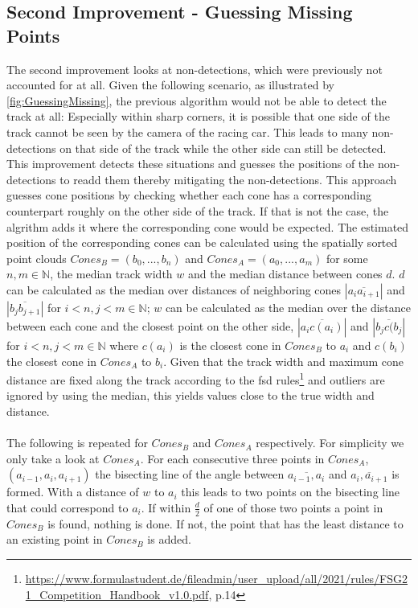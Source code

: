\subsection{Second Improvement - Guessing Missing Points}
The second improvement looks at non-detections, which were previously not accounted for at all. Given the following scenario, as illustrated by \ref{fig:GuessingMissing}, the previous algorithm would not be able to detect the track at all: Especially within sharp corners, it is possible that one side of the track cannot be seen by the camera of the racing car. This leads to many non-detections on that side of the track while the other side can still be detected. This improvement detects these situations and guesses the positions of the non-detections to readd them thereby mitigating the non-detections. This approach guesses cone positions by checking whether each cone has a corresponding counterpart roughly on the other side of the track. If that is not the case, the algrithm adds it where the corresponding cone would be expected. The estimated position of the corresponding cones can be calculated using the spatially sorted point clouds $Cones_B = (b_0,...,b_n)$ and $Cones_A = (a_0,...,a_m)$ for some $n,m \in \mathbb{N}$, the median track width $w$ and the median distance between cones $d$. $d$ can be calculated as the median over distances of neighboring cones $|\overline{a_i a_{i+1}}|$ and $|\overline{b_j b_{j+1}}|$ for $i<n,j<m \in \mathbb{N}$; $w$ can be calculated as the median over the distance between each cone and the closest point on the other side, $|\overline{a_i c(a_{i})}|$ and $|\overline{b_j c(b_{j}}|$ for $i<n,j<m \in \mathbb{N}$ where $c(a_i)$ is the closest cone in $Cones_B$ to $a_i$ and $c(b_i)$ the closest cone in $Cones_A$ to $b_i$. Given that the track width and maximum cone distance are fixed along the track according to the \ac{fsd} rules\footnote{\url{https://www.formulastudent.de/fileadmin/user_upload/all/2021/rules/FSG21_Competition_Handbook_v1.0.pdf}, p.14} and outliers are ignored by using the median, this yields values close to the true width and distance.\\
\\The following is repeated for $Cones_B$ and $Cones_A$ respectively. For simplicity we only take a look at $Cones_A$. For each consecutive three points in $Cones_A$, $(a_{i-1},a_{i},a_{i+1})$ the bisecting line of the angle between $\overline{a_{i-1},a_{i}}$ and $\overline{a_{i},a_{i+1}}$ is formed. With a distance of $w$ to $a_{i}$ this leads to two points on the bisecting line that could correspond to  $a_{i}$. If within $\frac{d}{2}$ of one of those two points a point in $Cones_B$ is found, nothing is done. If not,  the point that has the least distance to an existing point in $Cones_B$ is added. \\
